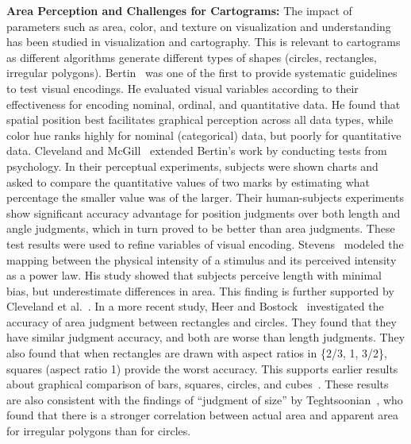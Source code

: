 \documentclass{egpubl}
\begin{document}
\noindent
\textbf{Area Perception and Challenges for Cartograms:}
The impact of parameters such as area, color, and texture on visualization and understanding has been studied in visualization and cartography. This is relevant to cartograms as different algorithms generate different types of shapes (circles, rectangles, irregular polygons). Bertin~\cite{BERTIN83} was one of the first to provide systematic guidelines to test visual encodings. He evaluated visual variables according to their effectiveness for encoding nominal, ordinal, and quantitative data. He found that spatial position best facilitates graphical perception across all data types, while color hue ranks highly for nominal (categorical) data, but poorly for quantitative data. 
Cleveland and McGill~\cite{cleveland1984graphical} extended Bertin's work 
by conducting tests from psychology. In their perceptual experiments, subjects were shown charts and asked to compare the quantitative values of two marks by estimating what percentage the smaller value was of the larger. Their human-subjects experiments show significant accuracy advantage for position judgments over both length and angle judgments, which in turn proved to be better than area judgments. These test results were used to refine variables of visual encoding.
Stevens~\cite{Steven_law} modeled the mapping between the physical intensity of a stimulus and its perceived intensity as a power law. His study showed that subjects perceive length with minimal bias, but underestimate differences in area. This finding is further supported by Cleveland et al.~\cite{cleveland1982judgments}. In a more recent study, Heer and Bostock~\cite{JM10} investigated the accuracy of area judgment between rectangles and circles. They found that they have similar judgment accuracy, and both are worse than length judgments. 
They also found that when rectangles are drawn with aspect ratios in \{2/3, 1, 3/2\}, squares (aspect ratio 1) provide the worst accuracy. This supports earlier results about graphical comparison of bars, squares, circles, and cubes~\cite{croxton1932graphic}. 
These results are also consistent with the findings of ``judgment of size'' by Teghtsoonian~\cite{teghtsoonian1965judgment}, who found that there is a stronger correlation between actual area and apparent area for irregular polygons than for circles. 
\end{document}
